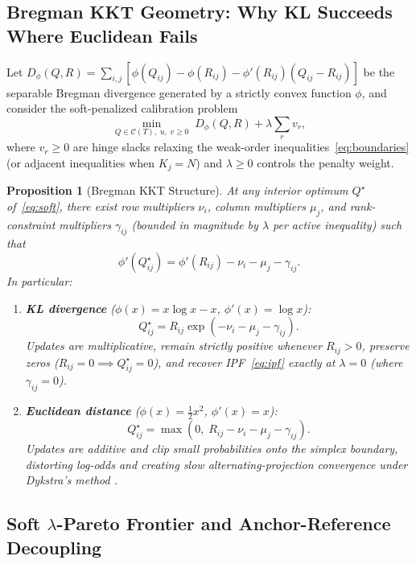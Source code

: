\documentclass[11pt]{article}
\newtheorem{proposition}{Proposition}
\begin{document}
\subsection{Bregman KKT Geometry: Why KL Succeeds Where Euclidean Fails}

Let $D_\phi(Q, R) = \sum_{i,j} [\phi(Q_{ij}) - \phi(R_{ij}) - \phi'(R_{ij})(Q_{ij} - R_{ij})]$ be the separable Bregman divergence generated by a strictly convex function $\phi$, and consider the soft-penalized calibration problem
\begin{equation}
\min_{Q \in \mathcal{C}(T),\; u,\; v \ge 0} \; D_\phi(Q, R) + \lambda \sum_{r} v_r,
\label{eq:soft}
\end{equation}
where $v_r \ge 0$ are hinge slacks relaxing the weak-order inequalities~\eqref{eq:boundaries} (or adjacent inequalities when $K_j = N$) and $\lambda \ge 0$ controls the penalty weight.

\begin{proposition}[Bregman KKT Structure]
\label{prop:bregman}
At any interior optimum $Q^\star$ of~\eqref{eq:soft}, there exist row multipliers $\nu_i$, column multipliers $\mu_j$, and rank-constraint multipliers $\gamma_{ij}$ (bounded in magnitude by $\lambda$ per active inequality) such that
\[
\phi'(Q^\star_{ij}) = \phi'(R_{ij}) - \nu_i - \mu_j - \gamma_{ij}.
\]
In particular:
\begin{enumerate}[label=(\alph*),leftmargin=*,itemsep=2pt]
\item \textbf{KL divergence} ($\phi(x) = x\log x - x$, $\phi'(x) = \log x$):
\[
Q^\star_{ij} = R_{ij}\exp(-\nu_i - \mu_j - \gamma_{ij}).
\]
Updates are multiplicative, remain strictly positive whenever $R_{ij} > 0$, preserve zeros ($R_{ij}=0 \implies Q^\star_{ij}=0$), and recover IPF~\eqref{eq:ipf} exactly at $\lambda = 0$ (where $\gamma_{ij} = 0$).
\item \textbf{Euclidean distance} ($\phi(x) = \tfrac{1}{2}x^2$, $\phi'(x) = x$):
\[
Q^\star_{ij} = \max\!\left(0,\; R_{ij} - \nu_i - \mu_j - \gamma_{ij}\right).
\]
Updates are additive and clip small probabilities onto the simplex boundary, distorting log-odds and creating slow alternating-projection convergence under Dykstra's method \citep{dykstra1983,bauschke1994}.
\end{enumerate}
\end{proposition}

\subsection{Soft \texorpdfstring{$\lambda$}{lambda}-Pareto Frontier and Anchor-Reference Decoupling}
\end{document}
